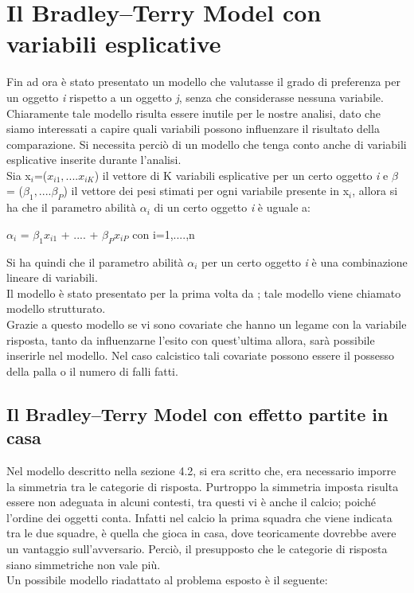 \section{Il Bradley–Terry Model con variabili esplicative}
Fin ad ora è stato presentato un modello che valutasse il grado di preferenza per un oggetto \textit{i} rispetto a un oggetto \textit{j}, senza che considerasse nessuna variabile. Chiaramente tale modello risulta essere inutile per le nostre analisi, dato che siamo interessati a capire quali variabili possono influenzare il risultato della comparazione. Si necessita perciò di un modello che tenga conto anche di variabili esplicative inserite durante l'analisi. \\
Sia x$_{i}$=($x_{i1},....x_{iK}$) il vettore di K variabili esplicative per un certo oggetto \textit{i} e $\beta$ = ($\beta_{1},....\beta_{P}$) il vettore dei pesi stimati per ogni variabile presente in x$_{i}$, allora si ha che il parametro abilità $\alpha_{i}$ di un certo oggetto \textit{i} è uguale a:

\begin{center}
	\begin{large}
	 $\alpha_{i}$ = $\beta_{1}x_{i1}$ + .... + $\beta_{P}x_{iP}$      con i=1,....,n
	\end{large}

\end{center}

Si ha quindi che il parametro abilità $\alpha_{i}$ per un certo oggetto \textit{i} è una combinazione lineare di variabili.\\
Il modello è stato presentato per la prima volta da \autocite{springall1973response}; tale modello viene chiamato modello strutturato.\\
 
Grazie a questo modello se vi sono covariate che hanno un legame con la variabile risposta, tanto da influenzarne l'esito con quest'ultima allora, sarà possibile inserirle nel modello. Nel caso calcistico tali covariate possono essere il possesso della palla o il numero di falli fatti.


\subsection{Il Bradley–Terry Model con effetto partite in casa}
Nel modello descritto nella sezione 4.2, si era scritto che, era necessario imporre la simmetria tra le categorie di risposta. Purtroppo la simmetria imposta risulta essere non adeguata in alcuni contesti, tra questi vi è anche il calcio; poiché l'ordine dei oggetti conta. Infatti nel calcio la prima squadra che viene indicata tra le due squadre, è quella che gioca in casa, dove teoricamente dovrebbe avere un vantaggio sull'avversario. Perciò, il presupposto che le categorie di risposta siano simmetriche non vale più. \\
Un possibile modello riadattato al problema esposto è il seguente:

